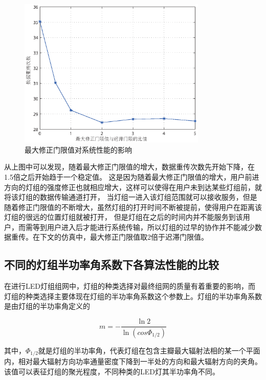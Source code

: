 \begin{figure}[htbp]
    \centering
	\includegraphics[width=0.8\textwidth]{figures/chapter-4/DistributionBiggestModify.eps}
	\caption{最大修正门限值对系统性能的影响}
	\label{fig:distribution-biggest-modify}
\end{figure}

从上图中可以发现，随着最大修正门限值的增大，数据重传次数先开始下降，在1.5倍之后开始趋于一个稳定值。
这是因为随着最大修正门限值的增大，用户前进方向的灯组的强度修正也就相应增大，这样可以使得在用户未到达某些灯组前，就将该灯组的数据传输通道打开，
当灯组一进入该灯组范围就可以接收服务，但是随着修正门限值的不断增大，虽然灯组的打开时间不断被提前，使得用户在距离该灯组的很远的位置灯组就被打开，
但是灯组在之后的时间内并不能服务到该用户，而需等到用户进入后才能进行系统传输，所以灯组的过早的协作并不能减少数据重传。在下文的仿真中，最大修正门限值取2倍于迟滞门限值。

\subsection{不同的灯组半功率角系数下各算法性能的比较}
在进行LED灯组组网中，灯组的种类选择对最终组网的质量有着重要的影响，而灯组的种类选择主要体现在灯组的半功率角系数这个参数上。灯组的半功率角系数是由灯组的半功率角定义的

\begin{equation}
    m =  - \frac{{\ln 2}}{{\ln (cos{\Phi _{1/2}})}}
\end{equation}

其中，$\Phi _{1/2}$就是灯组的半功率角，代表灯组在包含主瓣最大辐射法相的某一个平面内，相对最大辐射方向功率通量密度下降到一半处的方向和最大辐射方向的夹角。该值可以表征灯组的聚光程度，不同种类的LED灯其半功率角不同。


